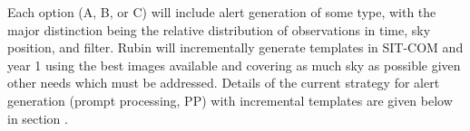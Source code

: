 Each option (A, B, or C) will include alert generation of some type, with the major distinction being the relative distribution of observations in time, sky position, and filter. 
Rubin will incrementally generate templates in SIT-COM and year 1 using the best images available and covering as much sky as possible given other needs which must be addressed.
Details of the current strategy for alert generation (prompt processing, PP) with incremental templates are given below in section .  




